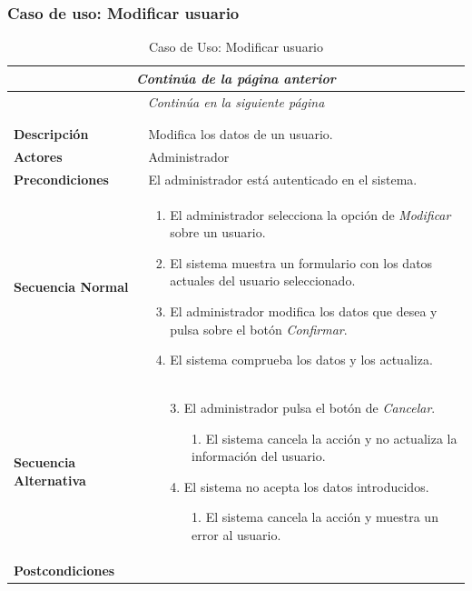 \newpage
\subsubsection*{Caso de uso: Modificar usuario }
\begin{longtable}{| p{4cm} | p{10cm} |}
\endfirsthead
\multicolumn{2}{c}{\textit{Continúa de la página anterior}}\\[12pt]
\hline
\endhead
\hline
\multicolumn{2}{c}{\textit{Continúa en la siguiente página}} \\
\endfoot
\hline
\caption{Caso de Uso: Modificar usuario}\label{fig:1}\\
\endlastfoot


\hline
\multicolumn{2}{|c|}{\textbf{CU$<$24$>$ - Modificar Usuario}} \\

\hline
\textbf{Descripción} &
Modifica los datos de un usuario.\\

\hline
\textbf{Actores} &
Administrador\\

\hline
\textbf{Precondiciones} &
El administrador está autenticado en el sistema.\\

\hline
\textbf{Secuencia Normal} &\mbox{}\par\vspace{-\baselineskip}
\begin{enumerate}[leftmargin=0.7cm, topsep=0.1cm]
\item El administrador selecciona la opción de \textit{Modificar} sobre un usuario.
\item El sistema muestra un formulario con los datos actuales del usuario seleccionado.
\item El administrador modifica los datos que desea y pulsa sobre el botón \textit{Confirmar}.
\item El sistema comprueba los datos y los actualiza.
\end{enumerate}


\\
\hline
\textbf{Secuencia Alternativa} &\mbox{}\par\vspace{-\baselineskip}
\begin{enumerate}[leftmargin=0.9cm, topsep=0.1cm]
\item[3.] El administrador pulsa el botón de \textit{Cancelar}.
	\begin{itemize}
	\item[1.] El sistema cancela la acción y no actualiza la información del usuario.
	\end{itemize}
\item[4.] El sistema no acepta los datos introducidos.
	\begin{itemize}
	\item[1.] El sistema cancela la acción y muestra un error al usuario.
	\end{itemize}
\end{enumerate}
\\

\hline
\textbf{Postcondiciones} & \\
\hline
\end{longtable}
